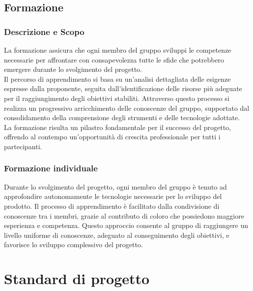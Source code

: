 \documentclass[10pt]{article}
\begin{document}
\begin{justify}
    \subsection{Formazione}
    \label{formazione}
    \subsubsection{Descrizione e Scopo}
    La formazione assicura che ogni membro del gruppo sviluppi le competenze necessarie per affrontare con consapevolezza tutte le sfide che potrebbero emergere durante lo svolgimento del progetto.\\
    Il percorso di apprendimento si basa su un'analisi dettagliata delle esigenze espresse dalla proponente, seguita dall'identificazione delle risorse più adeguate per il raggiungimento degli obiettivi stabiliti.
    Attraverso questo processo si realizza un progressivo arricchimento delle conoscenze del gruppo, supportato dal consolidamento della comprensione degli strumenti e delle tecnologie adottate.\\
    La formazione risulta un pilastro fondamentale per il successo del progetto, offrendo al contempo un'opportunità di crescita professionale per tutti i partecipanti.

    \subsubsection{Formazione individuale}
    Durante lo svolgimento del progetto, ogni membro del gruppo è tenuto ad approfondire autonomamente le tecnologie necessarie per lo sviluppo del prodotto. Il processo di apprendimento è facilitato dalla condivisione di conoscenze tra i membri, grazie al contributo di coloro che possiedono maggiore esperienza e competenza.
    Questo approccio consente al gruppo di raggiungere un livello uniforme di conoscenze, adeguato al conseguimento degli obiettivi, e favorisce lo sviluppo complessivo del progetto.

\newpage
\section{Standard di progetto}


\end{justify}
\end{document}
